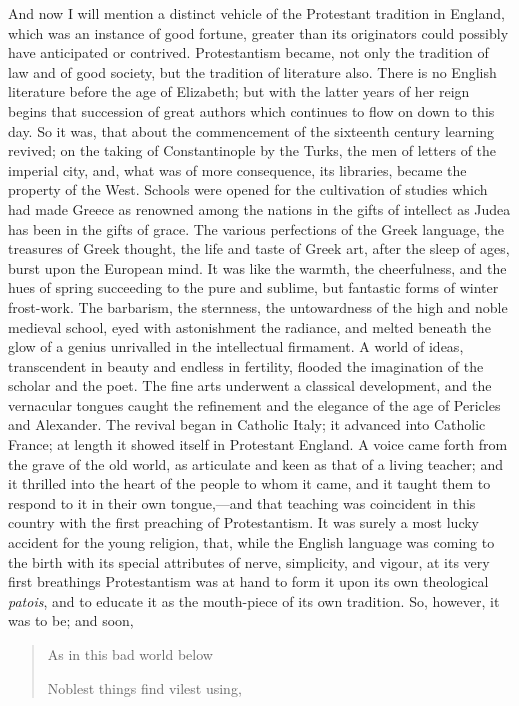 And now I will mention a distinct vehicle of the
Protestant tradition in England, which was an instance of
good fortune, greater than its originators could possibly
have anticipated or contrived. Protestantism became, not
only the tradition of law and of good society, but the
tradition of literature also. There is no English
literature before the age of Elizabeth; but with the
latter years of her reign begins that succession of great
authors which continues to flow on down to this day. So
it was, that about the commencement of the sixteenth
century learning revived; on the taking of Constantinople
by the Turks, the men of letters of the imperial city,
and, what was of more consequence, its libraries, became
the property of the West. Schools were opened for the
cultivation of studies which had made Greece as renowned
among the nations in the gifts of intellect as Judea has
been in the gifts of grace. The various perfections of
the Greek language, the treasures of Greek thought, the
life and taste of Greek art, after the sleep of ages,
burst upon the European mind. It was like the warmth, the
cheerfulness, and the hues of spring succeeding to the
pure and sublime, but fantastic forms of winter
frost-work. The barbarism, the sternness, the
untowardness of the high and noble medieval school, eyed
with astonishment the radiance, and melted beneath the
glow of a genius unrivalled in the intellectual
firmament. A world of ideas, transcendent in beauty and
endless in fertility, flooded the imagination of the
scholar and the poet. The fine arts underwent a classical
development, and the vernacular tongues caught the
refinement and the elegance of the age of Pericles and
Alexander. The revival began in Catholic Italy; it
advanced into Catholic France; at length it showed itself
in Protestant England. A voice came forth from the grave
of the old world, as articulate and keen as that of a
living teacher; and it thrilled into the heart of the
people to whom it came, and it taught them to respond to
it in their own tongue,—and that teaching was
coincident in this country with the first preaching of
Protestantism. It was surely a most lucky accident for
the young religion, that, while the English language was
coming to the birth with its special attributes of nerve,
simplicity, and vigour, at its very first breathings
Protestantism was at hand to form it upon its own
theological \emph{patois}, and to educate it as the
mouth-piece of its own tradition. So, however, it was to
be; and soon,

\begin{quote}

As in this bad world below

Noblest things find vilest using,

\end{quote}

